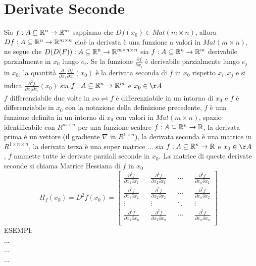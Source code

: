 \section{Derivate Seconde}
Sia $f:A\subseteq \mathbb{R}^n \rightarrow \mathbb{R}^m$ sappiamo che $Df(x_0)\in Mat(m\times n)$, allora $Df:A\subseteq \mathbb{R}^{n} \rightarrow \mathbb{R}^{m\times n}$ cioè la derivata è una funzione a valori in $Mat(m\times n)$, ne segue che $D(D(F)):A\subseteq \mathbb{R}^n \rightarrow \mathbb{R}^{m\times n\times n}$
sia $f:A\subseteq \mathbb{R}^n \rightarrow \mathbb{R}^m$ derivabile parzialmente in $x_0$ lungo $e_i$. Se la funzione $\frac{\partial{f}}{\partial{x_i}}$ è derivabile parzialmente lungo $e_j$ in $x_0$, la quantità $\frac{\partial}{\partial{x_j}}\frac{\partial{f}}{\partial{x_i}}(x_0)$ è la derivata seconda di $f$ in $x_0$ rispetto $x_i,x_j$ e si indica $\frac{\partial^2f}{\partial{x_j}\partial{x_i}}(x_0)$
sia $f:A\subseteq \mathbb{R}^n \rightarrow \mathbb{R}^m$ e $x_0\in\AA$\\
$f$ differenziabile due volte in $xo \rightleftharpoons f$ è differenziabile in un intorno di $x_0$ e $f$ è differenziabile in $x_0$
\observation
con la notazione della definizione precedente, $f$ è una funzione definita in un intorno di $x_0$ con valori in $Mat(m\times n)$, spazio identificabile con $R^{m\times n}$
\observation
per una funzione scalare $f:A\subseteq \mathbb{R}^n \rightarrow \mathbb{R}$, la derivata prima è un vettore (il gradiente $\nabla$ in $R^{1\times n}$), la derivata seconda è una matrice in $R^{1\times n \times n}$, la derivata terza è una super matrice ...
sia $f:A\subseteq \mathbb{R}^n \rightarrow \mathbb{R}$ e $x_0\in\AA$, $f$ ammette tutte le derivate parziali seconde in $x_0$. La matrice di queste derivate seconde si chiama Matrice Hessiana di $f$ in $x_0$
$$H_f(x_0)=D^2f(x_0) = \begin{bmatrix}
\frac{\partial^2f}{\partial{x_1}\partial{x_1}} && \frac{\partial^2f}{\partial{x_2}\partial{x_1}} && \dotsb && \frac{\partial^2f}{\partial{x_n}\partial{x_1}} \\
\frac{\partial^2f}{\partial{x_1}\partial{x_2}} && \frac{\partial^2f}{\partial{x_2}\partial{x_2}} && \dotsb && \frac{\partial^2f}{\partial{x_n}\partial{x_2}} \\
\vdots && \vdots && \ddots && \vdots \\
\frac{\partial^2f}{\partial{x_1}\partial{x_n}} && \frac{\partial^2f}{\partial{x_2}\partial{x_n}} && \dotsb && \frac{\partial^2f}{\partial{x_n}\partial{x_n}} \\
\end{bmatrix}$$ 
ESEMPI:\\
...\\
...\\
...\\

